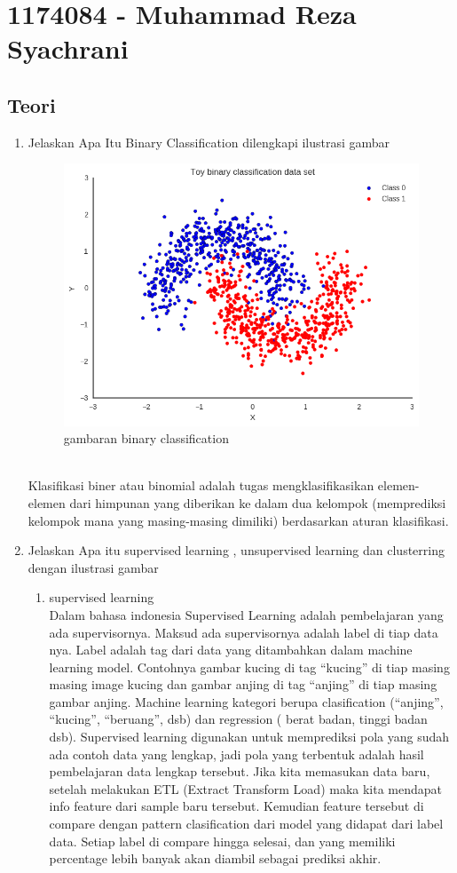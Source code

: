 \section{1174084 - Muhammad Reza Syachrani}
\subsection{Teori}
\begin{enumerate}
	\item Jelaskan Apa Itu Binary Classification dilengkapi ilustrasi gambar

\begin{figure}[H]
    \includegraphics[width=12cm]{figures/1174084/2/1.png}
    \centering
    \caption{gambaran binary classification}
\end{figure}
	\hfill\\
Klasifikasi biner atau binomial adalah tugas mengklasifikasikan elemen-elemen dari himpunan yang diberikan ke dalam dua kelompok (memprediksi kelompok mana yang masing-masing dimiliki) berdasarkan aturan klasifikasi. 

\item Jelaskan Apa itu supervised learning , unsupervised learning dan clusterring dengan ilustrasi gambar
\begin{enumerate}
\item supervised learning
	\hfill\\
	Dalam bahasa indonesia Supervised Learning adalah pembelajaran yang ada supervisornya. Maksud ada supervisornya adalah label di tiap data nya. Label adalah tag dari data yang ditambahkan dalam machine learning model. Contohnya gambar kucing di tag “kucing” di tiap masing masing image kucing dan gambar anjing di tag “anjing” di tiap masing gambar anjing. Machine learning kategori berupa clasification (“anjing”, “kucing”, “beruang”, dsb) dan regression ( berat badan, tinggi badan dsb). Supervised learning digunakan untuk memprediksi pola yang sudah ada contoh data yang lengkap, jadi pola yang terbentuk adalah hasil pembelajaran data lengkap tersebut. Jika kita memasukan data baru, setelah melakukan ETL (Extract Transform Load) maka kita mendapat info feature dari sample baru tersebut. Kemudian feature tersebut di compare dengan pattern clasification dari model yang didapat dari label data. Setiap label di compare hingga selesai, dan yang memiliki percentage lebih banyak akan diambil sebagai prediksi akhir.


\end{enumerate}
\end{enumerate}
